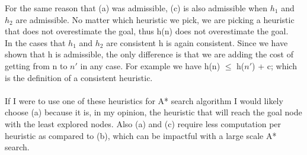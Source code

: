 \documentclass[12pt]{article}
\begin{document}
For the same reason that (a) was admissible, (c) is also admissible when $h_1$ and $h_2$ are admissible. No matter which heuristic we pick, we are picking a heuristic that does not overestimate the goal, thus h(n) does not overestimate the goal. \\
In the cases that $h_1$ and $h_2$ are consistent h is again consistent. Since we have shown that h is admissible, the only difference is that we are adding the cost of getting from n to $n'$ in any case. For example we have h(n) $\leq$ h($n'$) + c; which is the definition of a consistent heuristic.\\ \\
If I were to use one of these heuristics for A* search algorithm I would likely choose (a) because it is, in my opinion, the heuristic that will reach the goal node with the least explored nodes. Also (a) and (c) require less computation per heuristic as compared to (b), which can be impactful with a large scale A* search.
\newpage
\end{document}
